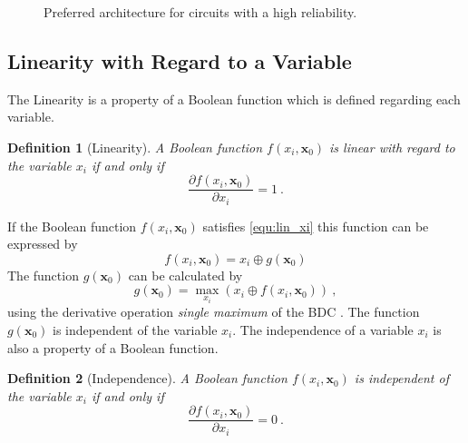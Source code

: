 \documentclass[12pt]{toptesi}
\newcommand\bx{\mathbf{x}}
\newtheorem{definition}{Definition}
\begin{document}
\begin{figure}
	\centering
{}		
	\caption{Preferred architecture for circuits with a high reliability.}
	\label{fig:dec_arch}
\end{figure}

\subsection{Linearity with Regard to a Variable}
\label{subsec:lin_wrt_v}
The Linearity is a property of a Boolean function which is defined regarding each variable. 

\begin{definition}[Linearity]
A Boolean function $f(x_i,\bx_0)$ is linear with regard to the variable $x_i$ if and only if
\begin{equation}
\frac{\partial f(x_i,\bx_0)}{\partial x_i} = 1~.
\label{equ:lin_xi}
\end{equation}
\end{definition}

If the Boolean function $f(x_i,\bx_0)$ satisfies \eqref{equ:lin_xi} this function can be expressed by
\begin{equation}
f(x_i,\bx_0)=x_i \oplus g(\bx_0)
\label{equ:lin_sep_xi}
\end{equation}
The function $g(\bx_0)$ can be calculated by
\begin{equation}
g(\bx_0) = \max_{x_i} \left(x_i \oplus f(x_i,\bx_0)\right)~,
\label{equ:g_x0}
\end{equation}
using the derivative operation \textit{single maximum} of the BDC \cite{SP_BDC_2010}. The function $g(\bx_0)$ is independent of the variable $x_i$. The independence of a variable $x_i$ is also a property of a Boolean function.

\begin{definition}[Independence]
A Boolean function $f(x_i,\bx_0)$ is independent of the variable $x_i$ if and only if
\begin{equation}
\frac{\partial f(x_i,\bx_0)}{\partial x_i} = 0~.
\label{equ:indep_xi}
\end{equation}
\end{definition}
\end{document}
